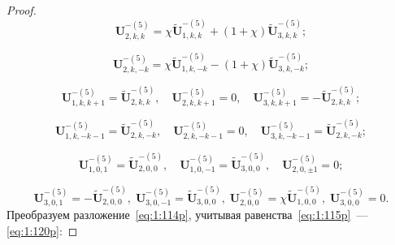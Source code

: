 \begin{proof}
\begin{equation}
\mathbf{U}_{2,k,k}^{-(5)}=\chi\mathbf{\tilde U}_{1,k,k}^{-(5)}+(1+\chi)\mathbf{\tilde U}_{3,k,k}^{-(5)};
\label{eq:1:115p}
\end{equation}

\begin{equation}
\mathbf{U}_{2,k,-k}^{-(5)}=\chi\mathbf{\tilde U}_{1,k,-k}^{-(5)}-(1+\chi)\mathbf{\tilde U}_{3,k,-k}^{-(5)};
\label{eq:1:116p}
\end{equation}

\begin{equation}
\mathbf{U}_{1,k,k+1}^{-(5)}=\mathbf{\tilde U}_{2,k,k}^{-(5)},\quad\mathbf{U}_{2,k,k+1}^{-(5)}=0,\quad\mathbf{U}_{3,k,k+1}^{-(5)}=-\mathbf{\tilde U}_{2,k,k}^{-(5)};
\label{eq:1:117p}
\end{equation}

\begin{equation}
\mathbf{U}_{1,k,-k-1}^{-(5)}=\mathbf{\tilde U}_{2,k,-k}^{-(5)},\quad\mathbf{U}_{2,k,-k-1}^{-(5)}=0,\quad\mathbf{U}_{3,k,-k-1}^{-(5)}=\mathbf{\tilde U}_{2,k,-k}^{-(5)};
\label{eq:1:118p}
\end{equation}

\begin{equation}
\mathbf{U}_{1,0,1}^{-(5)}=\mathbf{\tilde U}_{2,0,0}^{-(5)},\quad\mathbf{U}_{1,0,-1}^{-(5)}=\mathbf{\tilde U}_{3,0,0}^{-(5)},\quad\mathbf{U}_{2,0,\pm 1}^{-(5)}=0;
\label{eq:1:119p}
\end{equation}

\begin{equation}
\mathbf{U}_{3,0,1}^{-(5)}=-\mathbf{\tilde U}_{2,0,0}^{-(5)},\;\mathbf{U}_{3,0,-1}^{-(5)}=\mathbf{\tilde U}_{3,0,0}^{-(5)},\;\mathbf{U}_{2,0,0}^{-(5)}=\chi\mathbf{\tilde U}_{1,0,0}^{-(5)},\;\mathbf{U}_{3,0,0}^{-(5)}=0.
\label{eq:1:120p}
\end{equation}
Преобразуем разложение~\eqref{eq:1:114p}, учитывая равенства~\eqref{eq:1:115p}~--- \eqref{eq:1:120p}:


\end{proof}

